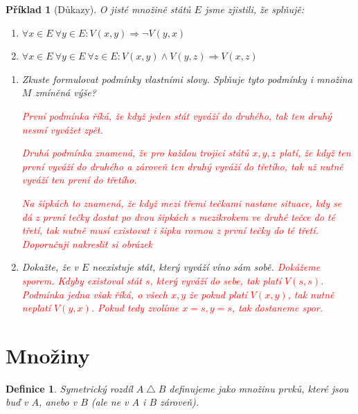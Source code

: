 \documentclass[10pt]{article}
\theoremstyle{definitionstyle}
\newtheorem{defn}{Definice}
\theoremstyle{problemstyle}
\newtheorem{problem}{Příklad}
\begin{document}
\begin{problem}[Důkazy]
O jisté množině států $E$ jsme zjistili, že splňujě:
\begin{enumerate}
    \item $\forall x \in E \ \forall y \in E: V(x,y) \Rightarrow \neg V(y,x)$
    \item $\forall x \in E \ \forall y \in E \  \forall z \in E : V(x,y) \wedge V(y,z) \Rightarrow V(x,z)$
\end{enumerate} 
\begin{enumerate}[label=(\alph*)]
    \item Zkuste formulovat podmínky vlastními slovy. Splňuje tyto podmínky i množina $M$ zmíněná výše?
    
    \textcolor{red}{První podmínka říká, že když jeden stát vyváží do druhého, tak ten druhý nesmí vyvážet zpět.}
    
    \textcolor{red}{Druhá podmínka znamená, že pro každou trojici států $x,y,z$ platí, že když ten první vyváží do druhého a zároveň ten druhý vyváží do třetího, tak už nutně vyváží ten první do třetího.}
    
    \textcolor{red}{Na šipkách to znamená, že když mezi třemi tečkami nastane situace, kdy se dá z první tečky dostat po dvou šipkách s mezikrokem ve druhé tečce do té třetí, tak nutně musí existovat i šipka rovnou z první tečky do té třetí. Doporučuji nakreslit si obrázek}
    \item Dokažte, že v $E$ neexistuje stát, který vyváží víno sám sobě. 
    \textcolor{red}{Dokážeme sporem. Kdyby existoval stát $s$, který vyváží do sebe, tak platí $V(s,s)$. Podmínka jedna však říká, o všech $x,y$ že pokud platí $V(x,y)$, tak nutně neplatí $V(y,x)$. Pokud tedy zvolíme $x=s, y=s$, tak dostaneme spor.}

\end{enumerate}

\end{problem}

\section{Množiny}

\begin{defn}
    Symetrický rozdíl $A \bigtriangleup B$ definujeme jako množinu prvků, které jsou buď v $A$, anebo v $B$ (ale ne v $A$ i $B$ zároveň).
\end{defn}
\end{document}
